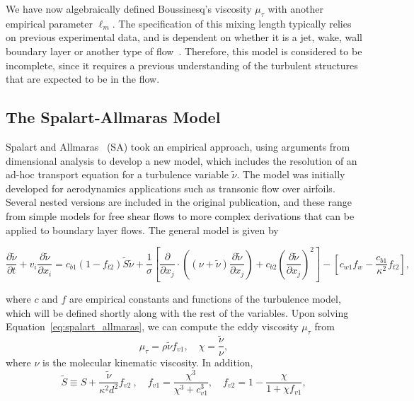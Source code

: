 We have now algebraically defined Boussinesq's viscosity $\mu_\tau$ with another empirical parameter $\ell_m$. The specification of this mixing length typically relies on previous experimental data, and is dependent on whether it is a jet, wake, wall boundary layer or another type of flow~\cite{andersonComputationalFluidMechanics2016}. Therefore, this model is considered to be incomplete, since it requires a previous understanding of the turbulent structures that are expected to be in the flow. 

\subsection{The Spalart-Allmaras Model}
Spalart and Allmaras~\cite{spalartOneequationTurbulenceModel1992} (SA) took an empirical approach, using arguments from dimensional analysis to develop a new model, which includes the resolution of an ad-hoc transport equation for a turbulence variable $\tilde \nu$. The model was initially developed for aerodynamics applications such as transonic flow over airfoils. Several nested versions are included in the original publication, and these range from simple models for free shear flows to more complex derivations that can be applied to boundary layer flows. The general model is given by
\begin{eqBox}
\begin{equation}
    \frac{\partial \tilde{\nu}}{\partial t} 
    + v_i \frac{\partial\tilde\nu}{\partial x_i} 
    = c_{b1} (1-f_{t2}) \tilde S \tilde \nu
    + \frac{1}{\sigma} 
     \left[ \frac{\partial}{\partial x_j} \cdot \left((\nu + \tilde \nu)\frac{\partial\tilde\nu}{\partial x_j} \right) 
      + c_{b2}\left(\frac{\partial\tilde \nu}{\partial x_j} \right)^2\right]
    - \left[c_{w1}f_w - \frac{c_{b1}}{\kappa^2}f_{t2}\right],
    \label{eq:spalart_allmaras}
\end{equation}
\end{eqBox}
where $c$ and $f$ are empirical constants and functions of the turbulence model, which will be defined shortly along with the rest of the variables. Upon solving Equation~\ref{eq:spalart_allmaras}, we can compute the eddy viscosity $\mu_\tau$ from
\begin{equation}
    \mu_\tau=\rho \tilde \nu f_{v1},\quad \chi=\frac{\tilde \nu}{\nu},
    \label{eq:sa_eddyviscosity}
\end{equation}
where $\nu$ is the molecular kinematic viscosity. In addition,
\begin{equation}
    \tilde S \equiv S + \frac{\tilde \nu}{\kappa^2 d^2}f_{v2}~,\quad f_{v1}=\frac{\chi^3}{\chi^3+c_{v1}^3},\quad f_{v2}=1-\frac{\chi}{1+\chi f_{v1}},
\end{equation}
